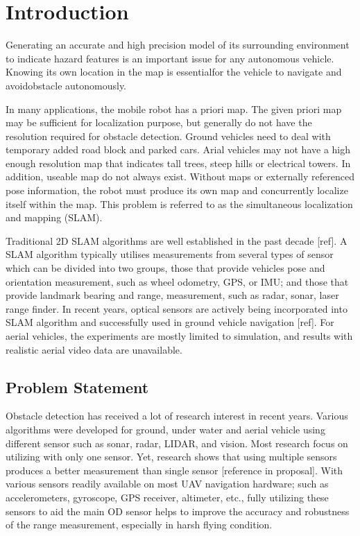 \chapter{Introduction}\label{ch:intro}

Generating an accurate and high precision model of its surrounding 
environment to indicate hazard features is an important issue for any 
autonomous vehicle. Knowing its own location in the map is essentialfor 
the vehicle to navigate and avoidobstacle autonomously. 

In many applications, the mobile robot has a priori map. The given 
priori map may be sufficient for localization purpose, but generally do 
not have the resolution required for obstacle detection. Ground vehicles 
need to deal with temporary added road block and parked cars. Arial 
vehicles may not have a high enough resolution map that indicates tall 
trees, steep hills or electrical towers. In addition, useable map do not 
always exist. Without maps or externally referenced pose information, 
the robot must produce its own map and concurrently localize itself 
within the map. This problem is referred to as the simultaneous 
localization and mapping (SLAM). 

Traditional 2D SLAM algorithms are well established in the past decade
[ref]. A SLAM algorithm typically utilises measurements from several
types of sensor which can be divided into two groups, those that
provide vehicles pose and orientation measurement, such as wheel
odometry, GPS, or IMU; and those that provide landmark bearing and
range, measurement, such as radar, sonar, laser range finder. In
recent years, optical sensors are actively being incorporated into
SLAM algorithm and successfully used in ground vehicle navigation
[ref]. For aerial vehicles, the experiments are mostly limited to
simulation, and results with realistic aerial video data are
unavailable.

\section{Problem Statement}\label{section:ProblemStatement}
Obstacle detection has received a lot of research interest in recent 
years. Various algorithms were developed for ground, under water and 
aerial vehicle using different sensor such as sonar, radar, LIDAR, and 
vision. Most research focus on utilizing with only one sensor. Yet, 
research shows that using multiple sensors produces a better measurement 
than single sensor [reference in proposal]. With various sensors 
readily available on most UAV navigation hardware; such as 
accelerometers, gyroscope, GPS receiver, altimeter, etc., fully 
utilizing these sensors to aid the main OD sensor helps to improve the 
accuracy and robustness of the range measurement, especially in harsh 
flying condition. 

